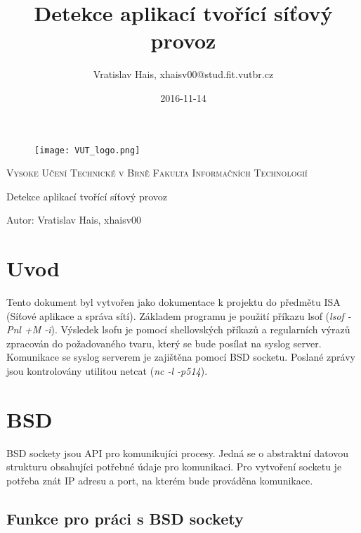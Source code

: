 \documentclass[a4paper]{article}
\title{Detekce aplikací tvořící síťový provoz}
\date{2016-11-14}
\author{Vratislav Hais, xhaisv00@stud.fit.vutbr.cz}
\begin{document}

	\begin{center}
		\begin{figure}[t!]
			\centering
			\texttt{[image: VUT\_logo.png]}
			\vspace{1in}
		\end{figure}

		\begin{center}
			\large
			\textsc{Vysoke Učení Technické v Brně}
			\textsc{Fakulta Informačních Technologií}
			\vspace{2in}
		\end{center}
		{
			\huge
			Detekce aplikací tvořící síťový provoz
		}
	\end{center}

	\vspace*{\fill}
	{
		\large
		\foreignlanguage{english}{Autor: Vratislav Hais, xhaisv00}
	}


	\newpage
	\tableofcontents
	\newpage

	\section{Uvod}

	Tento dokument byl vytvořen jako dokumentace k projektu do předmětu ISA (Síťové aplikace a správa sítí).
	Základem programu je použití příkazu lsof (\emph{lsof -Pnl +M -i}). Výsledek lsofu je pomocí shellovských příkazů a regularních výrazů zpracován do požadovaného tvaru, který se bude posílat na syslog server. Komunikace se syslog serverem je zajištěna pomocí BSD socketu. Poslané zprávy jsou kontrolovány utilitou netcat (\emph{nc -l -p514}).

	\section{BSD}

	BSD sockety jsou API pro komunikujíci procesy. Jedná se o abstraktní datovou strukturu obsahujíci potřebné údaje pro komunikaci. Pro vytvoření socketu je potřeba znát IP adresu a port, na kterém bude prováděna komunikace.

	\subsection{Funkce pro práci s BSD sockety}
\end{document}
